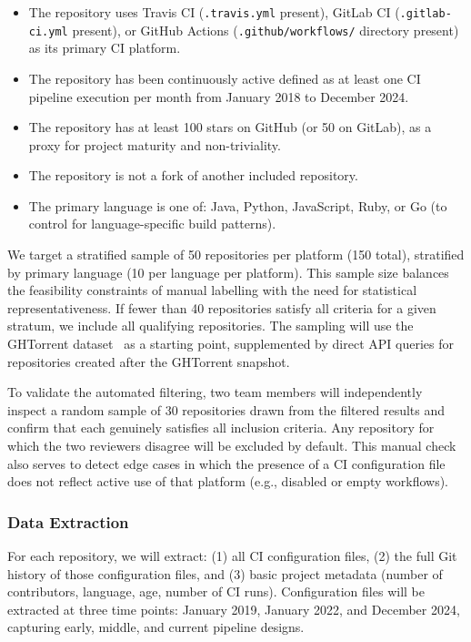 \documentclass[12pt, a4paper]{article}
\begin{document}
\begin{itemize}
    \item The repository uses Travis CI (\texttt{.travis.yml} present), GitLab CI
          (\texttt{.gitlab-ci.yml} present), or GitHub Actions
          (\texttt{.github/workflows/} directory present) as its primary CI platform.

    \item The repository has been continuously active defined as at least one CI
          pipeline execution per month from January 2018 to December 2024.

    \item The repository has at least 100 stars on GitHub (or 50 on GitLab), as a
          proxy for project maturity and non-triviality.

    \item The repository is not a fork of another included repository.

    \item The primary language is one of: Java, Python, JavaScript, Ruby, or Go (to
          control for language-specific build patterns).
\end{itemize}

We target a stratified sample of 50 repositories per platform (150 total), stratified
by primary language (10 per language per platform). This sample size balances the
feasibility constraints of manual labelling with the need for statistical
representativeness. If fewer than 40 repositories satisfy all criteria for a given
stratum, we include all qualifying repositories. The sampling will use the GHTorrent
dataset~\cite{gousios2013} as a starting point, supplemented by direct API queries
for repositories created after the GHTorrent snapshot.

To validate the automated filtering, two team members will independently inspect a
random sample of 30 repositories drawn from the filtered results and confirm that each
genuinely satisfies all inclusion criteria. Any repository for which the two reviewers
disagree will be excluded by default. This manual check also serves to detect edge
cases in which the presence of a CI configuration file does not reflect active use
of that platform (e.g., disabled or empty workflows).

\subsubsection{Data Extraction}

For each repository, we will extract: (1) all CI configuration files, (2) the full
Git history of those configuration files, and (3) basic project metadata (number of
contributors, language, age, number of CI runs). Configuration files will be extracted
at three time points: January 2019, January 2022, and December 2024, capturing early,
middle, and current pipeline designs.
\end{document}
